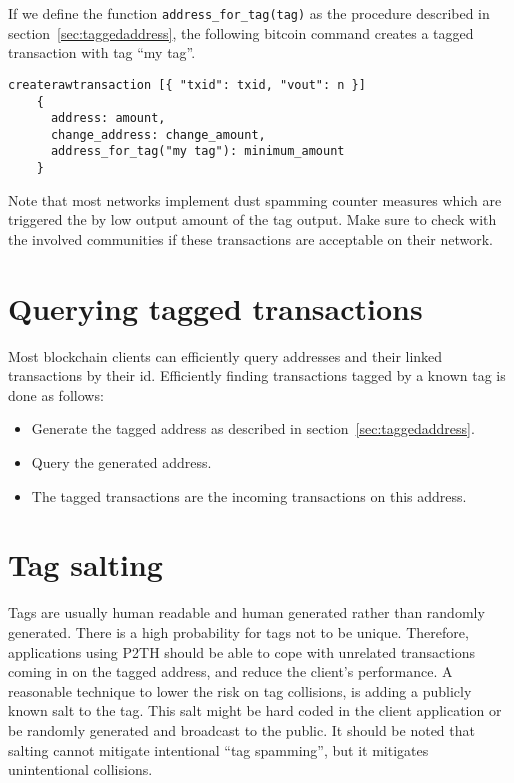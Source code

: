 \documentclass[a4paper,10pt]{article}
\begin{document}
If we define the function \verb|address_for_tag(tag)| as the procedure described in section~\ref{sec:taggedaddress}, the following bitcoin command creates a tagged transaction with tag ``my tag''.

\begin{scriptsize}\begin{verbatim}
createrawtransaction [{ "txid": txid, "vout": n }]
    {
      address: amount,
      change_address: change_amount,
      address_for_tag("my tag"): minimum_amount
    }
\end{verbatim}\end{scriptsize}

Note that most networks implement dust spamming counter measures which are triggered the by low output amount of the tag output.
Make sure to check with the involved communities if these transactions are acceptable on their network.


\section{Querying tagged transactions}
Most blockchain clients can efficiently query addresses and their linked transactions by their id.
Efficiently finding transactions tagged by a known tag is done as follows:
\begin{itemize}
 \item Generate the tagged address as described in section~\ref{sec:taggedaddress}.
 \item Query the generated address.
 \item The tagged transactions are the incoming transactions on this address.
\end{itemize}


\section{Tag salting}
Tags are usually human readable and human generated rather than randomly generated.
There is a high probability for tags not to be unique.
Therefore, applications using P2TH should be able to cope with unrelated transactions coming in on the tagged address, and reduce the client's performance.
A reasonable technique to lower the risk on tag collisions, is adding a publicly known salt to the tag.
This salt might be hard coded in the client application or be randomly generated and broadcast to the public.
It should be noted that salting cannot mitigate intentional ``tag spamming'', but it mitigates unintentional collisions.
\end{document}
